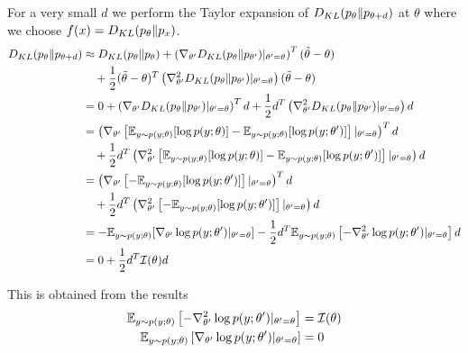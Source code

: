 \newcommand{\pt}{p_\theta}
\newcommand{\ptp}{p_{\theta'}}

\begin{answer}
For a very small $d$ we perform the Taylor expansion of $\KL(\pt \| p_{\theta+d})$ at $\theta$ where we choose $f(x) = \KL(\pt \| p_x)$.
\begin{align*}
\KL(\pt\|p_{\theta+d})
&\approx \KL(\pt\|\pt) + \left( \nabla_{\theta'} \KL(\pt\|\ptp)|_{\theta'=\theta} \right)^T (\tilde{\theta}-\theta) \\ &\quad+ \dfrac{1}{2} (\tilde{\theta}-\theta)^T \left( \nabla_{\theta'}^2\KL(\pt\|\ptp)|_{\theta'=\theta} \right) (\tilde{\theta}-\theta) \\
&= 0 + \left( \nabla_{\theta'} \KL(\pt\|\ptp)|_{\theta'=\theta} \right)^T d + \dfrac{1}{2} d^T \left( \nabla_{\theta'}^2 \KL(\pt\|\ptp)|_{\theta'=\theta} \right) d \\
&= \left( \nabla_{\theta'} \left[ \E_{y \sim p(y;\theta)}[\log p(y;\theta) ] - \E_{y \sim p(y;\theta)}[\log p(y;\theta')] \right] |_{\theta'=\theta} \right)^T d \\ &\quad+ \dfrac{1}{2}d^T \left( \nabla_{\theta'}^2 \left[ \E_{y \sim p(y;\theta)}[\log p(y;\theta)] - \E_{y \sim p(y;\theta)}[\log p(y;\theta')] \right] |_{\theta'=\theta} \right) d \\
&= \left( \nabla_{\theta'} \left[ -\E_{y \sim p(y;\theta)}[\log p(y;\theta')] \right] |_{\theta'=\theta} \right)^T d \\ &\quad+ \dfrac{1}{2} d^T \left( \nabla_{\theta'}^2 \left[ - \E_{y \sim p(y;\theta)}[\log p(y;\theta')] \right]|_{\theta'=\theta} \right) d \\
&= -\E_{y \sim p(y;\theta)}[\nabla_{\theta'}\log p(y;\theta')|_{\theta'=\theta}] - \dfrac{1}{2} d^T \E_{y \sim p(y;\theta)} \left[ -\nabla^2_{\theta'} \log p(y;\theta')|_{\theta'=\theta} \right] d \\
&= 0 + \dfrac{1}{2} d^T \mathcal{I}(\theta) d
\end{align*}

This is obtained from the results
\begin{align*}
\mathbb{E}_{y \sim p(y;\theta)} \left[ -\nabla^2_{\theta'} \log p(y;\theta')|_{\theta'=\theta} \right] &= \mathcal{I}(\theta) \\
\mathbb{E}_{y \sim p(y;\theta)} \left[ \nabla_{\theta'} \log p(y;\theta') |_{\theta'=\theta} \right] &= 0
\end{align*}
\end{answer}

